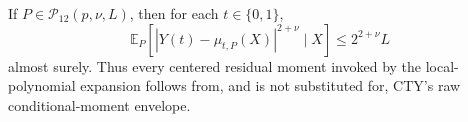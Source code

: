 If \(P\in\mathcal P_{12}(p,\nu,L)\), then for each \(t\in\{0,1\}\),
\[
 \mathbb E_P\!\left[|Y(t)-\mu_{t,P}(X)|^{2+\nu}\mid X\right]
 \leq 2^{2+\nu}L
\]
almost surely.  Thus every centered residual moment invoked by the local-polynomial expansion follows from, and is not substituted for, CTY's raw conditional-moment envelope.